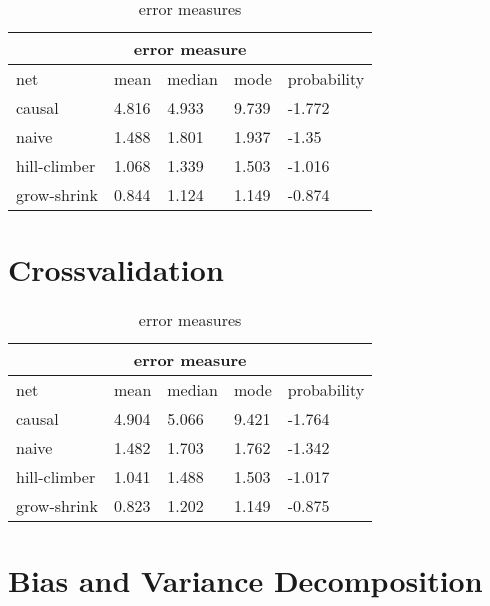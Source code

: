 \begin{table}[h]
\begin{tabular}{ l l l l l  }
 \hline
 \multicolumn{5}{c}{error measure} \\
 \hline
 net & mean & median & mode & probability\\
 \hline
 causal   & 4.816    & 4.933  & 9.739   &-1.772\\
 naive   & 1.488      & 1.801 & 1.937  &-1.35\\
 hill-climber   & 1.068      & 1.339 & 1.503  &-1.016\\
 grow-shrink   & 0.844     & 1.124  & 1.149 &-0.874\\
 
\end{tabular}
\caption[errors]{error measures}
\label{tab:2}
\end{table}

\section{Crossvalidation}


\begin{table}[h]
\begin{tabular}{ l l l l l  }
 \hline
 \multicolumn{5}{c}{error measure} \\
 \hline
 net & mean & median & mode & probability\\
 \hline
 causal   & 4.904    & 5.066  & 9.421   &-1.764\\
 naive   & 1.482      & 1.703 & 1.762  &-1.342\\
 hill-climber   & 1.041      & 1.488 & 1.503  &-1.017\\
 grow-shrink   & 0.823     & 1.202  & 1.149 &-0.875\\
 
\end{tabular}
\caption[errors]{error measures}
\label{tab:3}
\end{table}

\section{Bias and Variance Decomposition}

